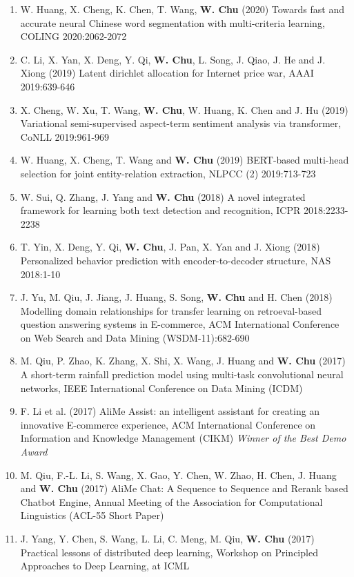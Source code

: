 \documentclass[line,10pt,final]{res}
\begin{document}
\begin{resume}
\begin{enumerate}
\item W. Huang, X. Cheng, K. Chen, T. Wang,  {\bf W. Chu} (2020) Towards fast and accurate neural Chinese word segmentation with multi-criteria learning, COLING 2020:2062-2072  
\item C. Li, X. Yan, X. Deng, Y. Qi,  {\bf W. Chu}, L. Song, J. Qiao, J. He and J. Xiong (2019) Latent dirichlet allocation for Internet price war, AAAI 2019:639-646  
\item X. Cheng, W. Xu, T. Wang,  {\bf W. Chu}, W. Huang, K. Chen and J. Hu (2019) Variational semi-supervised aspect-term sentiment analysis via transformer, CoNLL 2019:961-969  
\item W. Huang, X. Cheng, T. Wang and  {\bf W. Chu} (2019) BERT-based multi-head selection for joint entity-relation extraction, NLPCC (2) 2019:713-723  
\item W. Sui, Q. Zhang, J. Yang and  {\bf W. Chu} (2018) A novel integrated framework for learning both text detection and recognition, ICPR 2018:2233-2238  
\item T. Yin, X. Deng, Y. Qi,  {\bf W. Chu}, J. Pan, X. Yan and J. Xiong (2018) Personalized behavior prediction with encoder-to-decoder structure, NAS 2018:1-10  
\item J. Yu, M. Qiu, J. Jiang, J. Huang, S. Song, {\bf W. Chu} and H. Chen (2018) Modelling domain relationships for transfer learning on retroeval-based question answering systems in E-commerce, ACM International Conference on Web Search and Data Mining (WSDM-11):682-690  
\item M. Qiu, P. Zhao, K. Zhang, X. Shi, X. Wang, J. Huang and {\bf W. Chu} (2017) A short-term rainfall prediction model using multi-task convolutional neural networks, IEEE International Conference on Data Mining (ICDM)  
\item F. Li et al. (2017) AliMe Assist: an intelligent assistant for creating an innovative E-commerce experience, ACM International Conference on Information and Knowledge Management (CIKM) {\em Winner of the Best Demo Award}
\item M. Qiu, F.-L. Li, S. Wang, X. Gao, Y. Chen, W. Zhao, H. Chen, J. Huang and  {\bf W. Chu} (2017) AliMe Chat: A Sequence to Sequence and Rerank based Chatbot Engine, Annual Meeting of the Association for Computational Linguistics (ACL-55 Short Paper)  
\item J. Yang, Y. Chen, S. Wang, L. Li, C. Meng, M. Qiu, {\bf W. Chu} (2017) Practical lessons of distributed deep learning, Workshop on Principled Approaches to Deep Learning, at ICML  

\end{enumerate}
\end{resume}
\end{document}
